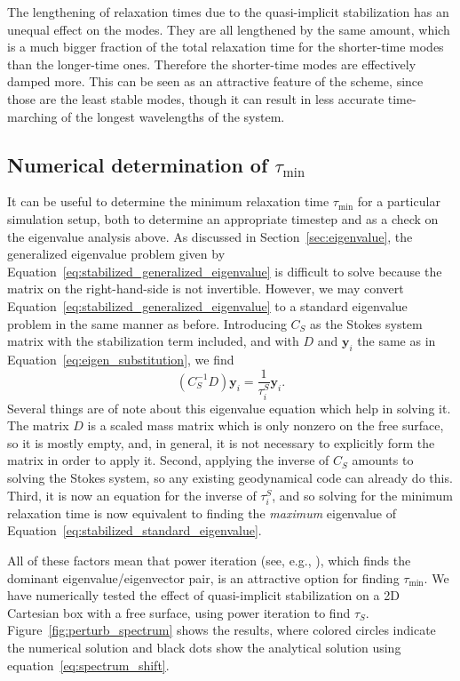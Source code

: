 \documentclass[preprint,12pt,authoryear]{elsarticle}
\begin{document}
The lengthening of relaxation times due to the quasi-implicit stabilization has an unequal 
effect on the modes. They are all lengthened by the same amount, which is a much bigger 
fraction of the total relaxation time for the shorter-time modes than the longer-time ones.
Therefore the shorter-time modes are effectively damped more.
This can be seen as an attractive feature of the scheme, since those are the least stable modes,
though it can result in less accurate time-marching of the longest wavelengths of the system.

\subsection{Numerical determination of $\tau_\mathrm{min}$}
\label{sec:numerical_determination}

It can be useful to determine the minimum relaxation time $\tau_{\mathrm{min}}$ for a particular
simulation setup, both to determine an appropriate timestep and as a check on the eigenvalue
analysis above. As discussed in Section~\ref{sec:eigenvalue}, the generalized eigenvalue problem
given by Equation~\eqref{eq:stabilized_generalized_eigenvalue} is difficult to solve because the matrix on
the right-hand-side is not invertible.
However, we may convert Equation~\eqref{eq:stabilized_generalized_eigenvalue} to a standard eigenvalue problem
in the same manner as before. Introducing $C_S$ as the Stokes system matrix with the stabilization term
included, and with $D$ and $\mathbf{y}_i$ the same as in Equation~\eqref{eq:eigen_substitution}, we find
\begin{equation}
(C_S^{-1}D)\mathbf{y}_i = \frac{1}{\tau^S_i} \mathbf{y}_i.
\label{eq:stabilized_standard_eigenvalue}
\end{equation}
Several things are of note about this eigenvalue equation which help in solving it.
The matrix $D$ is a scaled mass matrix which is only nonzero on the free surface,
so it is mostly empty, and, in general, it is not necessary to explicitly form the
matrix in order to apply it.
Second, applying the inverse of $C_S$ amounts to solving the Stokes system, so any
existing geodynamical code can already do this.
Third, it is now an equation for the inverse of $\tau^S_i$, and so solving for the 
minimum relaxation time is now equivalent to finding the \emph{maximum} eigenvalue
of Equation~\eqref{eq:stabilized_standard_eigenvalue}.

All of these factors mean that power iteration (see, e.g., \citet{golub2012matrix}),
which finds the dominant eigenvalue/eigenvector pair, is an attractive option for finding $\tau_\mathrm{min}$.
We have numerically tested the effect of quasi-implicit stabilization on a 2D Cartesian box with a free surface,
using power iteration to find $\tau_S$.
Figure~\ref{fig:perturb_spectrum} shows the results, where colored circles indicate the numerical
solution and black dots show the analytical solution using equation~\eqref{eq:spectrum_shift}.
\end{document}
